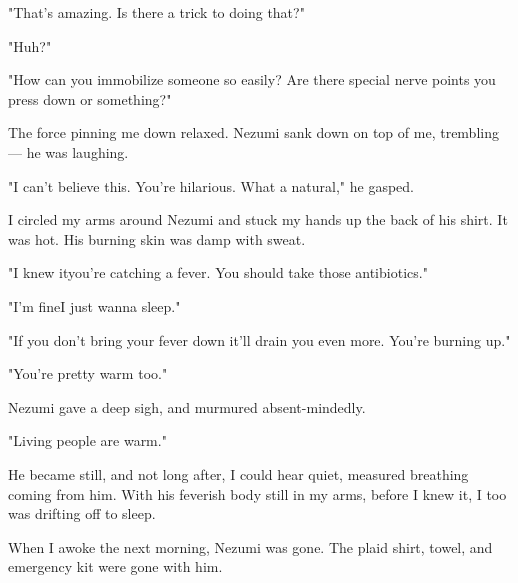 "That's amazing. Is there a trick to doing that?"

"Huh?"

"How can you immobilize someone so easily? Are there special nerve
points you press down or something?"

The force pinning me down relaxed. Nezumi sank down on top of me,
trembling --- he was laughing.

"I can't believe this. You're hilarious. What a natural," he gasped.

I circled my arms around Nezumi and stuck my hands up the back of his
shirt. It was hot. His burning skin was damp with sweat.

"I knew it\el you're catching a fever. You should take those
antibiotics."

"I'm fine\el I just wanna sleep."

"If you don't bring your fever down it'll drain you even more. You're
burning up."

"You're pretty warm too."

Nezumi gave a deep sigh, and murmured absent-mindedly.

"Living people are warm."

He became still, and not long after, I could hear quiet, measured
breathing coming from him. With his feverish body still in my arms,
before I knew it, I too was drifting off to sleep.

When I awoke the next morning, Nezumi was gone. The plaid shirt, towel,
and emergency kit were gone with him.